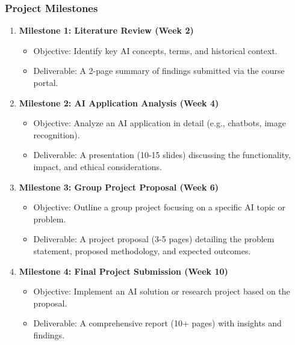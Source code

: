 \documentclass[aspectratio=169]{beamer}
\begin{document}
\begin{frame}[fragile]
    \frametitle{Project Milestones}
    \begin{enumerate}
        \item \textbf{Milestone 1: Literature Review (Week 2)}
        \begin{itemize}
            \item Objective: Identify key AI concepts, terms, and historical context.
            \item Deliverable: A 2-page summary of findings submitted via the course portal.
        \end{itemize}
        
        \item \textbf{Milestone 2: AI Application Analysis (Week 4)}
        \begin{itemize}
            \item Objective: Analyze an AI application in detail (e.g., chatbots, image recognition).
            \item Deliverable: A presentation (10-15 slides) discussing the functionality, impact, and ethical considerations.
        \end{itemize}
        
        \item \textbf{Milestone 3: Group Project Proposal (Week 6)}
        \begin{itemize}
            \item Objective: Outline a group project focusing on a specific AI topic or problem.
            \item Deliverable: A project proposal (3-5 pages) detailing the problem statement, proposed methodology, and expected outcomes.
        \end{itemize}
        
        \item \textbf{Milestone 4: Final Project Submission (Week 10)}
        \begin{itemize}
            \item Objective: Implement an AI solution or research project based on the proposal.
            \item Deliverable: A comprehensive report (10+ pages) with insights and findings.
        \end{itemize}
    \end{enumerate}
\end{frame}
\end{document}
